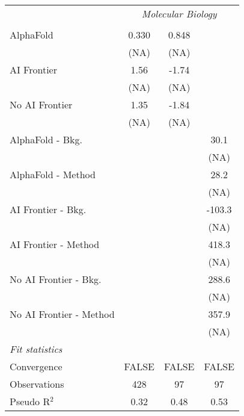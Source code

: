 \begin{tabular}{lccc}
 & \multicolumn{3}{c}{\textit{Molecular Biology}} \\ \\
   AlphaFold               & 0.330 & 0.848 &   \\   
                           & (NA)  & (NA)  &   \\   
   AI Frontier             & 1.56  & -1.74 &   \\   
                           & (NA)  & (NA)  &   \\   
   No AI Frontier          & 1.35  & -1.84 &   \\   
                           & (NA)  & (NA)  &   \\   
   AlphaFold - Bkg.        &       &       & 30.1\\   
                           &       &       & (NA)\\   
   AlphaFold - Method      &       &       & 28.2\\   
                           &       &       & (NA)\\   
   AI Frontier - Bkg.      &       &       & -103.3\\   
                           &       &       & (NA)\\   
   AI Frontier - Method    &       &       & 418.3\\   
                           &       &       & (NA)\\   
   No AI Frontier - Bkg.   &       &       & 288.6\\   
                           &       &       & (NA)\\   
   No AI Frontier - Method &       &       & 357.9\\   
                           &       &       & (NA)\\   
   \midrule
   \emph{Fit statistics}\\
   Convergence             &FALSE  & FALSE & FALSE\\  
   Observations            & 428   & 97    & 97\\  
   Pseudo R$^2$            & 0.32  & 0.48  & 0.53\\  
   

\end{tabular}
